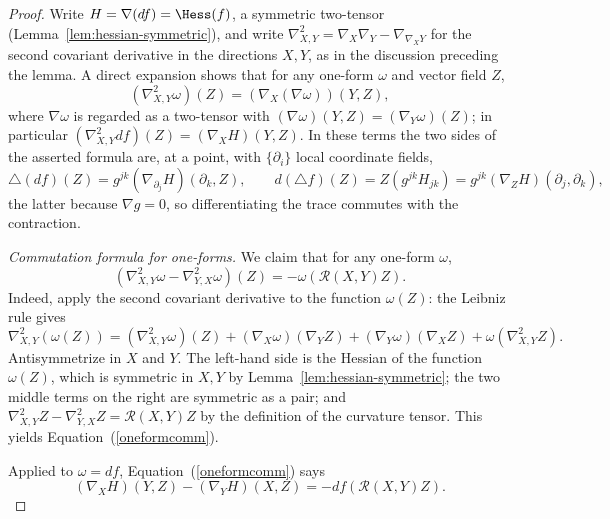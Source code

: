 \begin{proof}
\sketch
{}
\leanok
Write $H=\nabla(df)=\Hess(f)$, a symmetric two-tensor
(Lemma~\ref{lem:hessian-symmetric}), and write
$\nabla^2_{X,Y}=\nabla_X\nabla_Y-\nabla_{\nabla_XY}$ for the second
covariant derivative in the directions $X,Y$, as in the discussion
preceding the lemma. A direct expansion shows that for any one-form
$\omega$ and vector field $Z$,
$$\left(\nabla^2_{X,Y}\omega\right)(Z)=(\nabla_X(\nabla\omega))(Y,Z),$$
where $\nabla\omega$ is regarded as a two-tensor with
$(\nabla\omega)(Y,Z)=(\nabla_Y\omega)(Z)$; in particular
$\left(\nabla^2_{X,Y}df\right)(Z)=(\nabla_XH)(Y,Z)$. In these terms
the two sides of the asserted formula are, at a point, with
$\{\partial_i\}$ local coordinate fields,
$$\triangle(df)(Z)=g^{jk}\left(\nabla_{\partial_j}H\right)(\partial_k,Z),
\qquad
d(\triangle f)(Z)=Z\left(g^{jk}H_{jk}\right)
=g^{jk}\left(\nabla_ZH\right)(\partial_j,\partial_k),$$
the latter because $\nabla g=0$, so differentiating the trace
commutes with the contraction.

\emph{Commutation formula for one-forms.} We claim that for any
one-form $\omega$,
\begin{equation}\label{oneformcomm}
\left(\nabla^2_{X,Y}\omega-\nabla^2_{Y,X}\omega\right)(Z)
=-\omega\left({\mathcal R}(X,Y)Z\right).
\end{equation}
Indeed, apply the second covariant derivative to the function
$\omega(Z)$: the Leibniz rule gives
$$\nabla^2_{X,Y}\left(\omega(Z)\right)
=\left(\nabla^2_{X,Y}\omega\right)(Z)
+(\nabla_X\omega)(\nabla_YZ)+(\nabla_Y\omega)(\nabla_XZ)
+\omega\left(\nabla^2_{X,Y}Z\right).$$
Antisymmetrize in $X$ and $Y$. The left-hand side is the Hessian of
the function $\omega(Z)$, which is symmetric in $X,Y$ by
Lemma~\ref{lem:hessian-symmetric}; the two middle terms on the right
are symmetric as a pair; and
$\nabla^2_{X,Y}Z-\nabla^2_{Y,X}Z={\mathcal R}(X,Y)Z$ by the
definition of the curvature tensor. This yields
Equation~(\ref{oneformcomm}).

Applied to $\omega=df$, Equation~(\ref{oneformcomm}) says
\begin{equation}\label{Hcomm}
(\nabla_XH)(Y,Z)-(\nabla_YH)(X,Z)=-df\left({\mathcal
R}(X,Y)Z\right).
\end{equation}


\end{proof}
